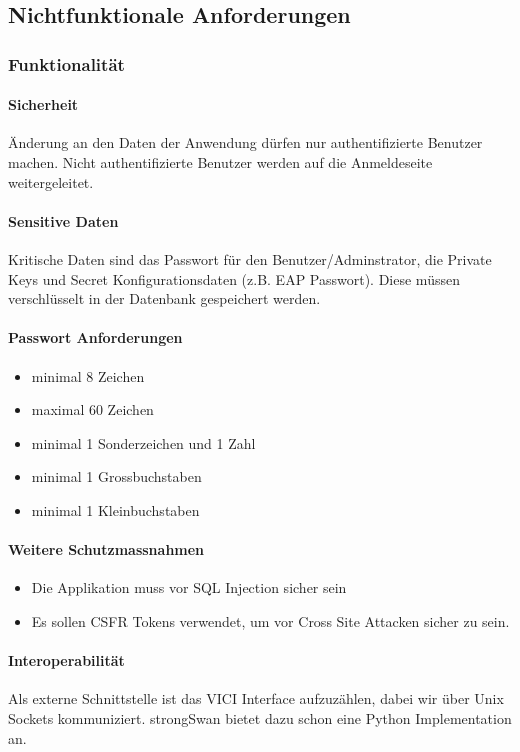 \subsection{Nichtfunktionale Anforderungen}
\subsubsection{Funktionalität}
\paragraph{Sicherheit}
Änderung an den Daten der Anwendung dürfen nur authentifizierte Benutzer machen. Nicht authentifizierte Benutzer werden auf die Anmeldeseite weitergeleitet.

\paragraph{Sensitive Daten}
Kritische Daten sind das Passwort für den Benutzer/Adminstrator, die Private Keys und Secret Konfigurationsdaten (z.B. EAP Passwort). Diese müssen verschlüsselt in der Datenbank gespeichert werden.

\paragraph{Passwort Anforderungen}
\begin{itemize}
	\item minimal 8 Zeichen
	\item maximal 60 Zeichen
	\item minimal 1 Sonderzeichen und 1 Zahl
	\item minimal 1 Grossbuchstaben
	\item minimal 1 Kleinbuchstaben
\end{itemize}

\paragraph{Weitere Schutzmassnahmen}
\begin{itemize}
	\item Die Applikation muss vor SQL Injection sicher sein
	\item Es sollen CSFR Tokens verwendet, um vor Cross Site Attacken sicher zu sein.
\end{itemize}

\paragraph{Interoperabilität}
Als externe Schnittstelle ist das VICI Interface aufzuzählen, dabei wir über Unix Sockets kommuniziert. strongSwan bietet dazu schon eine Python Implementation an.

